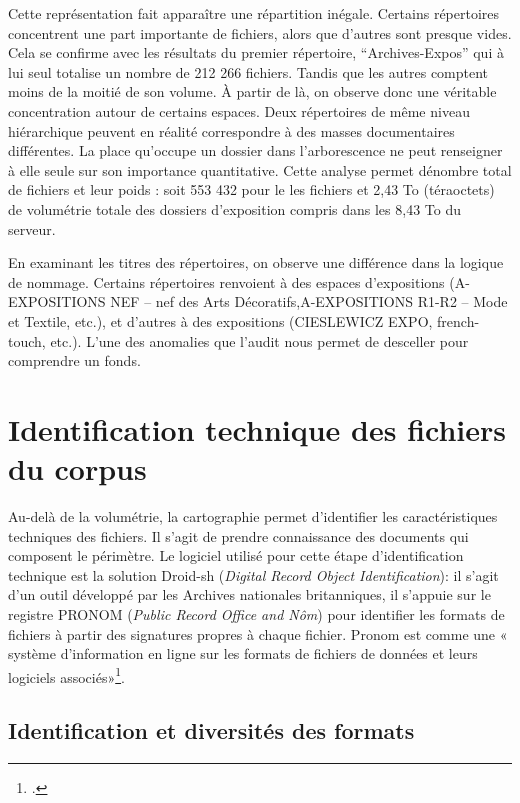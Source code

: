 Cette représentation fait apparaître une répartition inégale. Certains répertoires concentrent une part importante de fichiers, alors que d'autres sont presque vides. Cela se confirme avec les résultats du premier répertoire, \enquote{Archives-Expos} qui à lui seul totalise un nombre de 212 266 fichiers. Tandis que les autres comptent moins de la moitié de son volume. À partir de là, on observe donc une véritable concentration autour de certains espaces. Deux répertoires de même niveau hiérarchique peuvent en réalité correspondre à des masses documentaires différentes. La place qu'occupe un dossier dans l'arborescence ne peut renseigner à elle seule sur son importance quantitative. Cette analyse permet dénombre total de fichiers et leur poids : soit 553 432 pour le les fichiers et 2,43 To (téraoctets) de volumétrie totale des dossiers d'exposition compris dans les 8,43 To du serveur. 


En examinant les titres des répertoires, on observe une différence dans la logique de nommage. Certains répertoires renvoient à des espaces d'expositions (A-EXPOSITIONS NEF – nef des Arts Décoratifs,A-EXPOSITIONS R1-R2 – Mode et Textile, etc.), et d'autres à des expositions (CIESLEWICZ EXPO, french-touch, etc.). L'une des anomalies que l'audit nous permet de desceller pour comprendre un fonds.


\section{ Identification technique des fichiers du corpus}

\vspace{-0.4cm}
Au-delà de la volumétrie, la cartographie permet d'identifier les caractéristiques techniques des fichiers. Il s'agit de prendre connaissance des documents qui composent le périmètre. Le logiciel utilisé pour cette étape d'identification technique est la solution Droid-sh (\textit{Digital Record Object Identification}): il s'agit d'un outil développé par les Archives nationales britanniques, il s'appuie sur le registre PRONOM (\textit{Public Record Office and Nôm}) pour identifier les formats de fichiers à partir des signatures propres à chaque fichier. Pronom est comme une  « système d'information en ligne sur les formats de fichiers de données et leurs logiciels associés»\footnote{\cite{nationalarchives-pronom}.}.


\subsection*{Identification et diversités des formats}


